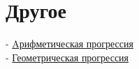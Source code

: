 \documentclass{article}
\begin{document}
\section{Другое}

- \href{https://ru.wikipedia.org/wiki/%D0%90%D1%80%D0%B8%D1%84%D0%BC%D0%B5%D1%82%D0%B8%D1%87%D0%B5%D1%81%D0%BA%D0%B0%D1%8F_%D0%BF%D1%80%D0%BE%D0%B3%D1%80%D0%B5%D1%81%D1%81%D0%B8%D1%8F}{Aрифметическая прогрессия} \\
- \href{https://ru.wikipedia.org/wiki/%D0%93%D0%B5%D0%BE%D0%BC%D0%B5%D1%82%D1%80%D0%B8%D1%87%D0%B5%D1%81%D0%BA%D0%B0%D1%8F_%D0%BF%D1%80%D0%BE%D0%B3%D1%80%D0%B5%D1%81%D1%81%D0%B8%D1%8F}{Геометрическая прогрессия} \\
\end{document}
